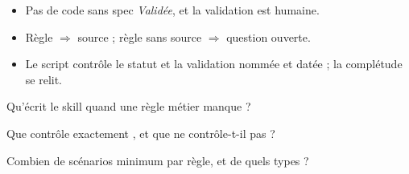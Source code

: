 \begin{retenir}[À retenir]
\begin{itemize}
  \item Pas de code sans spec \emph{Validée}, et la validation est humaine.
  \item Règle $\Rightarrow$ source ; règle sans source $\Rightarrow$ question ouverte.
  \item Le script contrôle le statut et la validation nommée et datée ; la complétude se relit.
\end{itemize}
\end{retenir}

\begin{acquis}
  \item Qu'écrit le skill quand une règle métier manque ?
  \item Que contrôle exactement , et que ne contrôle-t-il pas ?
  \item Combien de scénarios minimum par règle, et de quels types ?
\end{acquis}

